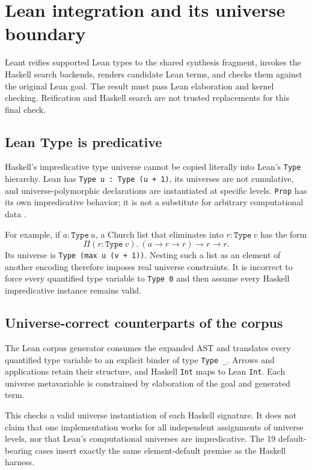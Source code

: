 \documentclass[11pt]{article}
\newcommand{\code}[1]{\texttt{#1}}
\begin{document}
\section{Lean integration and its universe boundary}

Leant reifies supported Lean types to the shared synthesis fragment, invokes
the Haskell search backends, renders candidate Lean terms, and checks them
against the original Lean goal. The result must pass Lean elaboration and
kernel checking. Reification and Haskell search are not trusted replacements
for this final check.

\subsection{Lean Type is predicative}

Haskell's impredicative type universe cannot be copied literally into Lean's
\code{Type} hierarchy. Lean has \code{Type u : Type (u + 1)}, its universes are
not cumulative, and universe-polymorphic declarations are instantiated at
specific levels. \code{Prop} has its own impredicative behavior; it is not a
substitute for arbitrary computational data \cite{leanuniverses}.

For example, if $a : \code{Type}\ u$, a Church list that eliminates into
$r : \code{Type}\ v$ has the form
\[
 \Pi(r:\code{Type}\ v).\ (a\to r\to r)\to r\to r.
\]
Its universe is \code{Type (max u (v + 1))}. Nesting such a list as an element
of another encoding therefore imposes real universe constraints. It is
incorrect to force every quantified type variable to \code{Type 0} and then
assume every Haskell impredicative instance remains valid.

\subsection{Universe-correct counterparts of the corpus}

The Lean corpus generator consumes the expanded AST and translates every
quantified type variable to an explicit binder of type \code{Type \_}. Arrows
and applications retain their structure, and Haskell \code{Int} maps to Lean
\code{Int}. Each universe metavariable is constrained by elaboration of the
goal and generated term.

This checks a valid universe instantiation of each Haskell signature. It does
not claim that one implementation works for all independent assignments of
universe levels, nor that Lean's computational universes are impredicative.
The 19 default-bearing cases insert exactly the same element-default premise
as the Haskell harness.
\end{document}
